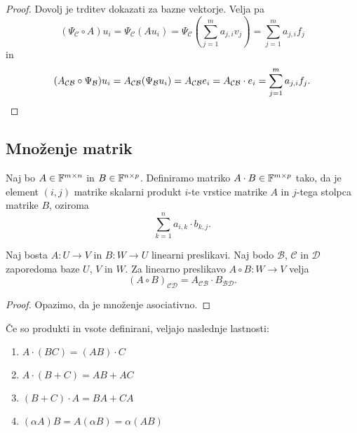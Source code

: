 \documentclass[12pt, a4paper]{article}
\begin{document}
\begin{proof}
Dovolj je trditev dokazati za bazne vektorje. Velja pa
\[
(\Psi_{\mathcal{C}}\circ A)u_i=\Psi_{\mathcal{C}}(Au_i)
=\Psi_{\mathcal{C}}\left(\sum_{j=1}^m a_{j,i}v_j\right)
=\sum_{j=1}^m a_{j,i}f_j
\]
in
\[
(A_{\mathcal{CB}}\circ \Psi_{\mathcal{B}})u_i=A_{\mathcal{CB}}(\Psi_{\mathcal{B}}u_i)
=A_{\mathcal{CB}}e_i
=A_{\mathcal{CB}}\cdot e_i
=\sum_{j=1}^m a_{j,i}f_j.\qedhere
\]
\end{proof}

\newpage

\subsection{Množenje matrik}

\begin{okvir}
\begin{definicija}
Naj bo $A\in\mathbb{F}^{m\times n}$ in $B\in\mathbb{F}^{n\times p}$. Definiramo matriko $A\cdot B\in\mathbb{F}^{m\times p}$ tako, da je element $(i,j)$ matrike skalarni produkt $i$-te vrstice matrike $A$ in $j$-tega stolpca matrike $B$, oziroma
\[
\sum_{k=1}^n a_{i,k}\cdot b_{k,j}.
\]
\end{definicija}
\end{okvir}

\begin{izrek}
Naj bosta $A\colon U\to V$ in $B\colon W\to U$ linearni preslikavi. Naj bodo $\mathcal{B}$, $\mathcal{C}$ in $\mathcal{D}$ zaporedoma baze $U$, $V$ in $W$. Za linearno preslikavo $A\circ B\colon W\to V$ velja
\[
(A\circ B)_{\mathcal{CD}}=A_{\mathcal{CB}}\cdot B_{\mathcal{BD}}.
\]
\end{izrek}

\begin{proof}
Opazimo, da je množenje asociativno.
\end{proof}

\begin{posledica}
Če so produkti in vsote definirani, veljajo naslednje lastnosti:

\begin{enumerate}
\item $A\cdot(BC)=(AB)\cdot C$
\item $A\cdot(B+C)=AB+AC$
\item $(B+C)\cdot A=BA+CA$
\item $(\alpha A)B=A(\alpha B)=\alpha(AB)$
\end{enumerate}
\end{posledica}
\end{document}
